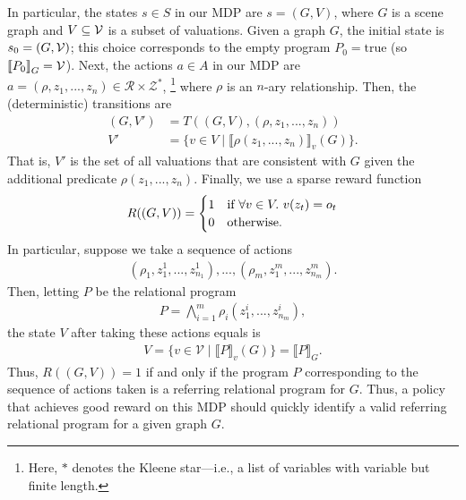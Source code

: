 In particular, the states $s\in S$ in our MDP are $s=(G,V)$, where $G$ is a scene graph and $V \subseteq \mathcal{V}$ is a subset of valuations. Given a graph $G$, the initial state is $s_0=(G,\mathcal{V})$; this choice corresponds to the empty program $P_0=\text{true}$ (so $\left\llbracket P_0 \right\rrbracket_G = \mathcal{V}$). Next, the actions $a\in A$ in our MDP are $a=(\rho,z_1,...,z_n)\in\mathcal{R}\times\mathcal{Z}^*$,%
\footnote{Here, $*$ denotes the Kleene star---i.e., a list of variables with variable but finite length.} where $\rho$ is an $n$-ary relationship. Then, the (deterministic) transitions are
\begin{align*}
(G,V')&=T((G,V),(\rho,z_1,...,z_n)) \\
V'&=\{v\in V\mid\llbracket\rho(z_1,...,z_n)\rrbracket_v(G)\}.
\end{align*}
That is, $V'$ is the set of all valuations that are consistent with $G$ given the additional predicate $\rho(z_1,...,z_n)$. Finally, we use a sparse reward function
\begin{align*}
R((G,V))=
\begin{cases}
1&\text{if}~\forall v \in V .\ v(z_{t}) = o_{t} \\
0&\text{otherwise}.
\end{cases}
\end{align*}
In particular, suppose we take a sequence of actions
\begin{align*}
(\rho_1,z^1_1,...,z^1_{n_1}),...,(\rho_m,z^m_1,...,z^m_{n_m}).
\end{align*}
Then, letting $P$ be the relational program
\begin{align*}
P=\bigwedge_{i=1}^m\rho_i(z^i_1,...,z^i_{n_m}),
\end{align*}
the state $V$ after taking these actions equals is
\begin{align*}
V=\{v\in\mathcal{V}\mid\llbracket P\rrbracket_v(G)\}=\llbracket P\rrbracket_G.
\end{align*}
Thus, $R((G,V))=1$ if and only if the program $P$ corresponding to the sequence of actions taken is a referring relational program for $G$. Thus, a policy that achieves good reward on this MDP should quickly identify a valid referring relational program for a given graph $G$.

